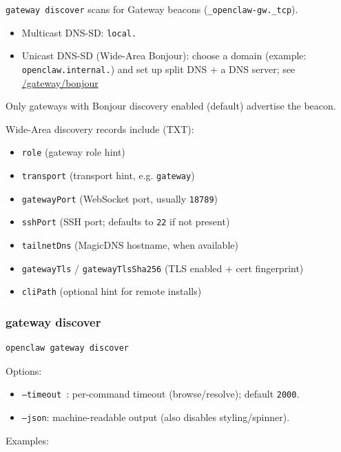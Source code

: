 \texttt{gateway discover} scans for Gateway beacons (\texttt{\_openclaw-gw.\_tcp}).

\begin{itemize}
  \item Multicast DNS-SD: \texttt{local.}
  \item Unicast DNS-SD (Wide-Area Bonjour): choose a domain (example: \texttt{openclaw.internal.}) and set up split DNS + a DNS server; see \href{/gateway/bonjour}{/gateway/bonjour}
\end{itemize}


Only gateways with Bonjour discovery enabled (default) advertise the beacon.

Wide-Area discovery records include (TXT):

\begin{itemize}
  \item \texttt{role} (gateway role hint)
  \item \texttt{transport} (transport hint, e.g. \texttt{gateway})
  \item \texttt{gatewayPort} (WebSocket port, usually \texttt{18789})
  \item \texttt{sshPort} (SSH port; defaults to \texttt{22} if not present)
  \item \texttt{tailnetDns} (MagicDNS hostname, when available)
  \item \texttt{gatewayTls} / \texttt{gatewayTlsSha256} (TLS enabled + cert fingerprint)
  \item \texttt{cliPath} (optional hint for remote installs)
\end{itemize}


\subsubsection{gateway discover}


\begin{lstlisting}[language=bash]
openclaw gateway discover
\end{lstlisting}


Options:

\begin{itemize}
  \item \texttt{--timeout }: per-command timeout (browse/resolve); default \texttt{2000}.
  \item \texttt{--json}: machine-readable output (also disables styling/spinner).
\end{itemize}


Examples:

